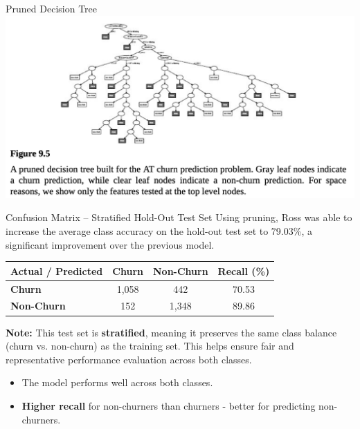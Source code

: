 \documentclass[aspectratio=169,xcolor=dvipsnames]{beamer}
\begin{document}
\begin{frame}{Pruned Decision Tree}
\centering
\includegraphics[scale=0.4]{images/pruned.png}
\end{frame}

\begin{frame}{Confusion Matrix – Stratified Hold-Out Test Set}
Using pruning, Ross was able to increase the average class accuracy on the hold-out
test set to 79.03\%, a significant improvement over the previous model.
\begin{table}[ht]
\centering
\begin{tabular}{l|cc|c}
\textbf{Actual / Predicted} & \textbf{Churn} & \textbf{Non-Churn} & \textbf{Recall (\%)} \\
\hline
\textbf{Churn}      & 1,058 & 442   & 70.53 \\
\textbf{Non-Churn}  & 152   & 1,348 & 89.86 \\
\end{tabular}
\end{table}

\vspace{1em}
\textbf{Note:} This test set is \textbf{stratified}, meaning it preserves the same class balance (churn vs. non-churn) as the training set. This helps ensure fair and representative performance evaluation across both classes.
\begin{itemize}
  \item The model performs well across both classes.
  \item \textbf{Higher recall} for non-churners than churners - better for predicting non-churners.
\end{itemize}

\end{frame}
\end{document}
